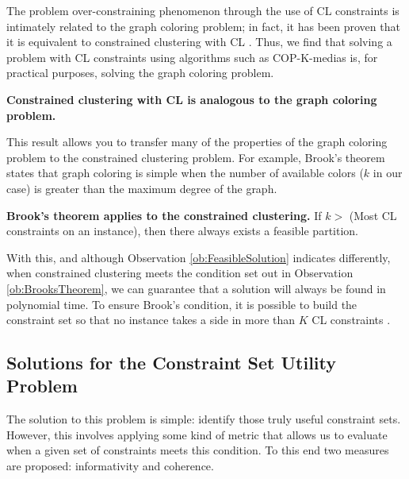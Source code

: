 The problem over-constraining phenomenon through the use of \acf{CL} constraints is intimately related to the graph coloring problem; in fact, it has been proven that it is equivalent to constrained clustering with \acf{CL} \cite{davidson2006identifying}. Thus, we find that solving a problem with \acf{CL} constraints using algorithms such as COP-K-medias is, for practical purposes, solving the graph coloring problem.

\begin{observation}
	
	\textbf{Constrained clustering with \acs{CL} is analogous to the graph coloring problem.} \cite{davidson2007survey}
	
\end{observation}

This result allows you to transfer many of the properties of the graph coloring problem to the constrained clustering problem. For example, Brook's theorem states that graph coloring is simple when the number of available colors ($k$ in our case) is greater than the maximum degree of the graph.

\begin{observation}
	
	\textbf{Brook's theorem applies to the constrained clustering.}
	If $ k > $ (Most \acs{CL} constraints on an instance), then there always exists a feasible partition. \cite{davidson2007survey} \label{ob:BrooksTheorem}
	
\end{observation}

With this, and although Observation \ref{ob:FeasibleSolution} indicates differently, when constrained clustering meets the condition set out in Observation \ref{ob:BrooksTheorem}, we can guarantee that a solution will always be found in polynomial time. To ensure Brook's condition, it is possible to build the constraint set so that no instance takes a side in more than $K$ \acf{CL} constraints \cite{davidson2006identifying}.

\subsection{Solutions for the Constraint Set Utility Problem}

The solution to this problem is simple: identify those truly useful constraint sets. However, this involves applying some kind of metric that allows us to evaluate when a given set of constraints meets this condition. To this end two measures are proposed: informativity and coherence.

